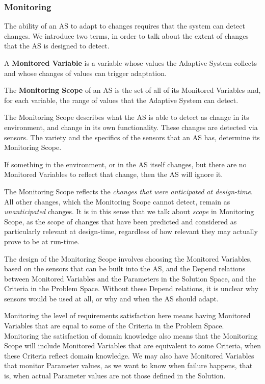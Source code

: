 \documentclass[graybox]{svmult}
\newcommand{\zi}[1]{\textit{#1}}
\newcommand{\xb}[1]{\textbf{#1}}
\newcommand{\ASfull}{Adaptive System}
\newcommand{\AS}{AS}
\newcommand{\SolutionSpace}{Solution Space}
\newcommand{\ProblemSpace}{Problem Space}
\newcommand{\Solution}{Solution}
\newcommand{\Criteria}{Criteria}
\newcommand{\Parameter}{Parameter}
\newcommand{\Depend}{Depend}
\newcommand{\MonitoringScope}{Monitoring Scope}
\newcommand{\MonitoredVariable}{Monitored Variable}
\begin{document}
%
\subsubsection{Monitoring}\label{s:rpas:monitoring}
The ability of an \AS{} to adapt to changes requires that the system can detect changes. We introduce two terms, in order to talk about the extent of changes that the \AS{} is designed to detect.

\begin{definition}\label{d:monitored-variable}
A \xb{\MonitoredVariable{}} is a variable whose values the \ASfull{} collects and whose changes of values can trigger adaptation.
\end{definition}

\begin{definition}\label{d:monitoring-scope}
The \xb{\MonitoringScope} of an \AS{} is the set of all of its \MonitoredVariable s and, for each variable, the range of values that the \ASfull{} can detect.
\end{definition}

The \MonitoringScope{} describes what the \AS{} is able to detect as change in its environment, and change in its own functionality. These changes are detected via sensors. The variety and the specifics of the sensors that an \AS{} has, determine its \MonitoringScope.

If something in the environment, or in the \AS{} itself changes, but there are no \MonitoredVariable s to reflect that change, then the \AS{} will ignore it. 

The \MonitoringScope{} reflects the \zi{changes that were anticipated at design-time}. All other changes, which the \MonitoringScope{} cannot detect, remain as \zi{unanticipated} changes. It is in this sense that we talk about \zi{scope} in \MonitoringScope, as the scope of changes that have been predicted and considered as particularly relevant at design-time, regardless of how relevant they may actually prove to be at run-time.

The design of the \MonitoringScope{} involves choosing the \MonitoredVariable s, based on the sensors that can be built into the \AS, and the \Depend{} relations between \MonitoredVariable s and the \Parameter s in the \SolutionSpace, and the \Criteria{} in the \ProblemSpace. Without these \Depend{} relations, it is unclear why sensors would be used at all, or why and when the \AS{} should adapt. 

Monitoring the level of requirements satisfaction here means having \MonitoredVariable s that are equal to some of the \Criteria{} in the \ProblemSpace. Monitoring the satisfaction of domain knowledge also means that the \MonitoringScope{} will include \MonitoredVariable s that are equivalent to some \Criteria, when these \Criteria{} reflect domain knowledge. We may also have \MonitoredVariable s that monitor \Parameter{} values, as we want to know when failure happens, that is, when actual \Parameter{} values are not those defined in the \Solution.
\end{document}
